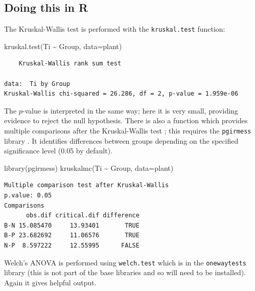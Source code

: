 \documentclass[
  oneside]{krantz}
\newenvironment{Shaded}{\begin{snugshade}}{\end{snugshade}}
\newcommand{\AttributeTok}[1]{\textcolor[rgb]{0.77,0.63,0.00}{#1}}
\newcommand{\FunctionTok}[1]{\textcolor[rgb]{0.00,0.00,0.00}{#1}}
\newcommand{\NormalTok}[1]{#1}
\newcommand{\SpecialCharTok}[1]{\textcolor[rgb]{0.00,0.00,0.00}{#1}}
\begin{document}
\hypertarget{doing-this-in-r-18}{%
\subsection{Doing this in R}\label{doing-this-in-r-18}}

The Kruskal-Wallis test is performed with the \texttt{kruskal.test} function:

\begin{Shaded}
\begin{Highlighting}[]
\FunctionTok{kruskal.test}\NormalTok{(Ti }\SpecialCharTok{\textasciitilde{}}\NormalTok{ Group, }\AttributeTok{data=}\NormalTok{plant)}
\end{Highlighting}
\end{Shaded}

\begin{verbatim}
    Kruskal-Wallis rank sum test

data:  Ti by Group
Kruskal-Wallis chi-squared = 26.286, df = 2, p-value = 1.959e-06
\end{verbatim}

The \(p\)-value is interpreted in the same way; here it is very small, providing evidence to reject the null hypothesis. There is also a function which provides multiple comparisons after the Kruskal-Wallis test \citep{Siegel&Castellan1988}; this requires the \texttt{pgirmess} library \citep{R-pgirmess}. It identifies differences between groups depending on the specified significance level (0.05 by default).

\begin{Shaded}
\begin{Highlighting}[]
\FunctionTok{library}\NormalTok{(pgirmess)}
\FunctionTok{kruskalmc}\NormalTok{(Ti }\SpecialCharTok{\textasciitilde{}}\NormalTok{ Group, }\AttributeTok{data=}\NormalTok{plant)}
\end{Highlighting}
\end{Shaded}

\begin{verbatim}
Multiple comparison test after Kruskal-Wallis 
p.value: 0.05 
Comparisons
      obs.dif critical.dif difference
B-N 15.085470     13.93401       TRUE
B-P 23.682692     11.06576       TRUE
N-P  8.597222     12.55995      FALSE
\end{verbatim}

Welch's ANOVA is performed using \texttt{welch.test} which is in the \texttt{onewaytests} library \citep{R-onewaytests} (this is not part of the base libraries and so will need to be installed). Again it gives helpful output.
\end{document}
